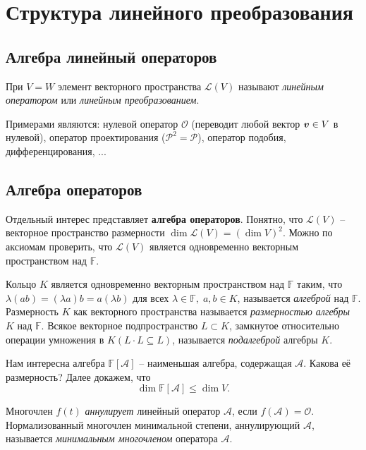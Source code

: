 \section{Структура линейного преобразования}

\subsection{Алгебра линейный операторов}
При $V = W$ элемент векторного пространства $\mathcal L (V)$ называют \textit{линейным оператором} или \textit{линейным преобразованием}. 

Примерами являются: нулевой оператор $\mathcal O$ (переводит любой вектор $\mbox{\boldmath $v$} \in V$  в нулевой), оператор проектирования ($\mathcal P^2 = \mathcal P$), оператор подобия, дифференцирования, ...


\subsection{Алгебра операторов}


Отдельный интерес представляет \textbf{алгебра операторов}. Понятно, что $\mathcal L (V)$ -- векторное пространство размерности $\dim \mathcal L (V) = \left(\dim V\right)^2$. Можно по аксиомам проверить, что $\mathcal L (V)$ является одновременно  векторным пространством над $\mathbb{F}$.

\begin{to_def} 
    Кольцо $K$ является одновременно векторным пространством над $\mathbb{F}$ таким, что $\lambda(ab) = (\lambda a) b = a (\lambda b)$ для всех $\lambda \in \mathbb{F}, \; a,b \in K $, называется \textit{алгеброй} над $\mathbb{F}$. Размерность $K  $ как векторного пространства называется \textit{размерностью алгебры} $K $ над $\mathbb{F} $. Всякое векторное подпространство $L \subset K $, замкнутое относительно операции умножения в $K (L \cdot L \subseteq L)$, называется \textit{подалгеброй} алгебры $K $.
\end{to_def}

Нам интересна алгебра $\mathbb{F}[\mathcal A] $ -- наименьшая алгебра, содержащая $\mathcal A $. Какова её размерность? Далее докажем, что 
$$
    \dim \mathbb{F}[\mathcal A] \leq \dim V.
$$

\begin{to_def} 
    Многочлен $f(t)$ \textit{аннулирует} линейный оператор $\mathcal A$, если $f(\mathcal A) = \mathcal O $. Нормализованный многочлен минимальной степени, аннулирующий $\mathcal A $, называется \textit{минимальным многочленом} оператора $\mathcal A $. 
\end{to_def}


